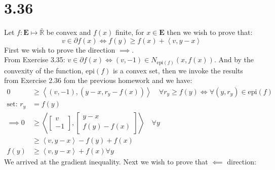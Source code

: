 \documentclass[]{article}
\begin{document}
\section*{3.36}
    Let $f: \mathbf{E}\mapsto \bar{\mathbb{R}}$ be convex and $f(x)$ finite, for $x \in \mathbf{E}$ then we wish to prove that: 
    $$
        v \in \partial f(x) \iff f(y) \ge f(x) + \left\langle v, y - x \right\rangle
    $$
    First we wish to prove the direction $\implies$.
    \\
    From Exercise 3.35: $v\in \partial f(x) \iff (v, -1) \in N_{\text{epi}(f)}(x, f(x))$. And by the convexity of the function, $\text{epi}(f)$ is a convex set, then we invoke the results from Exercise 2.36 fom the previous homework and we have: 
    \begin{align*}\tag{3.36.1}\label{eqn:3.36.1}
        0 &\ge \left\langle (v, -1), (y - x, r_y - f(x)) \right\rangle 
        \quad
        \forall r_y \ge f(y) \iff \forall  (y, r_y)\in \text{epi}(f)
        \\
        \text{set: }r_y &= f(y)
        \\
        \implies 0 &\ge \left\langle 
            \begin{bmatrix}
                v\\ -1
            \end{bmatrix}, 
            \begin{bmatrix}
                y - x
                \\
                f(y) - f(x)
            \end{bmatrix}
        \right\rangle\quad \forall y
        \\
        & \ge 
        \left\langle v, y - x \right\rangle - f(y) + f(x)
        \\
        f(y) &\ge \left\langle v, y - x \right\rangle + f(x) \forall y
    \end{align*}
    We arrived at the gradient inequality. Next we wish to prove that $\impliedby$ direction: 
\end{document}

